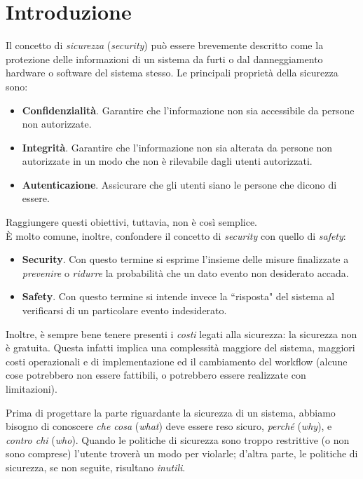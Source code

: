 \chapter{Introduzione}
Il concetto di \textit{sicurezza} (\textit{security}) può essere brevemente descritto come la protezione delle informazioni di un sistema da furti o dal danneggiamento hardware o software del sistema stesso. Le principali proprietà della sicurezza sono:
\begin{itemize}
	\item \textbf{Confidenzialità}. Garantire che l'informazione non sia accessibile da persone non autorizzate.
	\item \textbf{Integrità}. Garantire che l'informazione non sia alterata da persone non autorizzate in un modo che non è rilevabile dagli utenti autorizzati.
	\item \textbf{Autenticazione}. Assicurare che gli utenti siano le persone che dicono di essere.
\end{itemize}
Raggiungere questi obiettivi, tuttavia, non è così semplice.\\
È molto comune, inoltre, confondere il concetto di \textit{security} con quello di \textit{safety}:
\begin{itemize}
	\item \textbf{Security}. Con questo termine si esprime l’insieme delle misure finalizzate a \textit{prevenire} o \textit{ridurre} la probabilità che un dato evento non desiderato accada.
	\item \textbf{Safety}. Con questo termine si intende invece la \textquotedblleft risposta" del sistema al verificarsi di un particolare evento indesiderato.
\end{itemize}
Inoltre, è sempre bene tenere presenti i \textit{costi} legati alla sicurezza: la sicurezza non è gratuita. Questa infatti implica una complessità maggiore del sistema, maggiori costi operazionali e di implementazione ed il cambiamento del workflow (alcune cose potrebbero non essere fattibili, o potrebbero essere realizzate con limitazioni).

Prima di progettare la parte riguardante la sicurezza di un sistema, abbiamo bisogno di conoscere \textit{che cosa} (\textit{what}) deve essere reso sicuro, \textit{perché} (\textit{why}), e \textit{contro chi} (\textit{who}). Quando le politiche di sicurezza sono troppo restrittive (o non sono comprese) l'utente troverà un modo per violarle; d'altra parte, le politiche di sicurezza, se non seguite, risultano \textit{inutili}.

